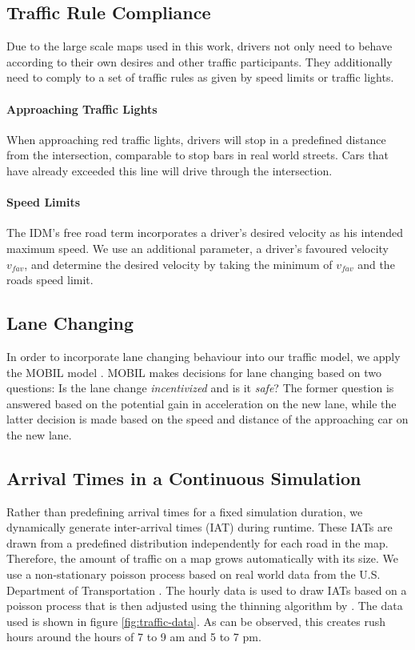 \documentclass[11pt]{article}
\begin{document}
\subsection{Traffic Rule Compliance}
Due to the large scale maps used in this work, drivers not only need to behave according to their own desires and other traffic participants. They additionally need to comply to a set of traffic rules as given by speed limits or traffic lights.

\paragraph{Approaching Traffic Lights} When approaching red traffic lights, drivers will stop in a predefined distance from the intersection, comparable to stop bars in real world streets. Cars that have already exceeded this line will drive through the intersection. 

\paragraph{Speed Limits} The IDM's free road term incorporates a driver's desired velocity as his intended maximum speed. We use an additional parameter, a driver's favoured velocity $v_{fav}$, and determine the desired velocity by taking the minimum of $v_{fav}$ and the roads speed limit.

\subsection{Lane Changing}
In order to incorporate lane changing behaviour into our traffic model, we apply the MOBIL model \citep{treiber2002realistische, kesting2007general}. MOBIL makes decisions for lane changing based on two questions: Is the lane change \textit{incentivized} and is it \textit{safe}? The former question is answered based on the potential gain in acceleration on the new lane, while the latter decision is made based on the speed and distance of the approaching car on the new lane.

\subsection{Arrival Times in a Continuous Simulation}
Rather than predefining arrival times for a fixed simulation duration, we dynamically generate inter-arrival times (IAT) during runtime. These IATs are drawn from a predefined distribution independently for each road in the map. Therefore, the amount of traffic on a map grows automatically with its size. We use a non-stationary poisson process based on real world data from the U.S. Department of Transportation \citep{trafficdata}. The hourly data is used to draw IATs based on a poisson process that is then adjusted using the thinning algorithm by \citet{lewis1979simulation}. The data used is shown in figure \ref{fig:traffic-data}. As can be observed, this creates rush hours around the hours of 7 to 9 am and 5 to 7 pm.
\end{document}
